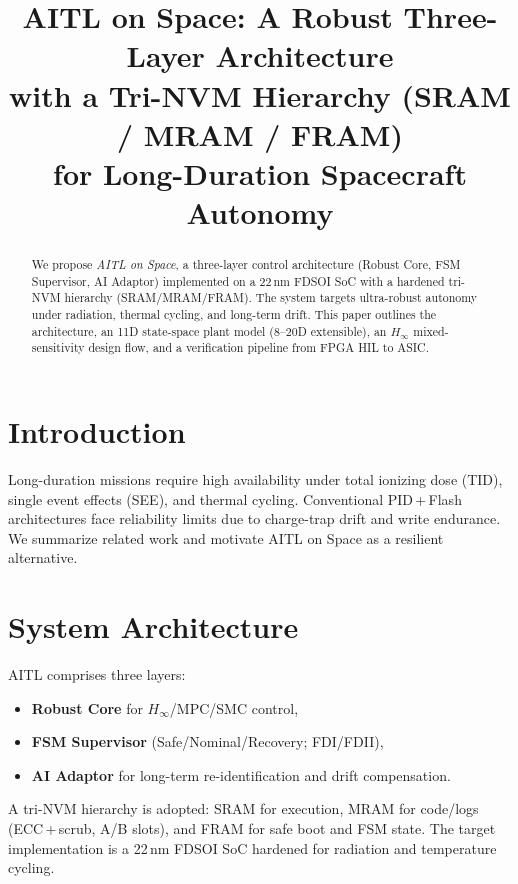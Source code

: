 \documentclass[conference]{IEEEtran}
\title{AITL on Space: A Robust Three-Layer Architecture\\
with a Tri-NVM Hierarchy (SRAM / MRAM / FRAM)\\
for Long-Duration Spacecraft Autonomy}
\author{
\IEEEauthorblockN{Shinichi Samizo}
\IEEEauthorblockA{Independent Semiconductor Researcher\\
Former Engineer at Seiko Epson Corporation\\
Email: shin3t72@gmail.com\quad GitHub: \url{https://github.com/Samizo-AITL}}
}
\begin{document}
\maketitle

\begin{abstract}
We propose \emph{AITL on Space}, a three-layer control architecture (Robust Core, FSM Supervisor, AI Adaptor) implemented on a 22\,nm FD\!SOI SoC with a hardened tri-NVM hierarchy (SRAM/MRAM/FRAM). The system targets ultra-robust autonomy under radiation, thermal cycling, and long-term drift. This paper outlines the architecture, an 11D state-space plant model (8--20D extensible), an $H_\infty$ mixed-sensitivity design flow, and a verification pipeline from FPGA HIL to ASIC.
\end{abstract}

\section{Introduction}
Long-duration missions require high availability under total ionizing dose (TID), single event effects (SEE), and thermal cycling. Conventional PID\,+\,Flash architectures face reliability limits due to charge-trap drift and write endurance. We summarize related work and motivate AITL on Space as a resilient alternative.

\section{System Architecture}
AITL comprises three layers:
\begin{itemize}
  \item \textbf{Robust Core} for $H_\infty$/MPC/SMC control,
  \item \textbf{FSM Supervisor} (Safe/Nominal/Recovery; FDI/FDII),
  \item \textbf{AI Adaptor} for long-term re-identification and drift compensation.
\end{itemize}
A tri-NVM hierarchy is adopted: SRAM for execution, MRAM for code/logs (ECC\,+\,scrub, A/B slots), and FRAM for safe boot and FSM state. The target implementation is a 22\,nm FD\!SOI SoC hardened for radiation and temperature cycling.
\end{document}
